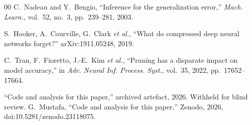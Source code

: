 \documentclass[conference]{IEEEtran}
\begin{document}
\begin{thebibliography}{00}
 C.~Nadeau and Y.~Bengio, ``Inference for the generalization error,'' \emph{Mach. Learn.}, vol.~52, no.~3, pp.~239--281, 2003.

 S.~Hooker, A.~Courville, G.~Clark \emph{et al.}, ``What do compressed deep neural networks forget?'' arXiv:1911.05248, 2019.

 C.~Tran, F.~Fioretto, J.-E.~Kim \emph{et al.}, ``Pruning has a disparate impact on model accuracy,'' in \emph{Adv. Neural Inf. Process. Syst.}, vol.~35, 2022, pp.~17652--17664.

\ifblind
{} \anon{} ``Code and analysis for this paper,'' archived artefact, 2026. Withheld for blind review.
\else
{} G.~Mustafa, ``Code and analysis for this paper,'' Zenodo, 2026, doi:10.5281/zenodo.23118075.
\fi

\end{thebibliography}
\end{document}
